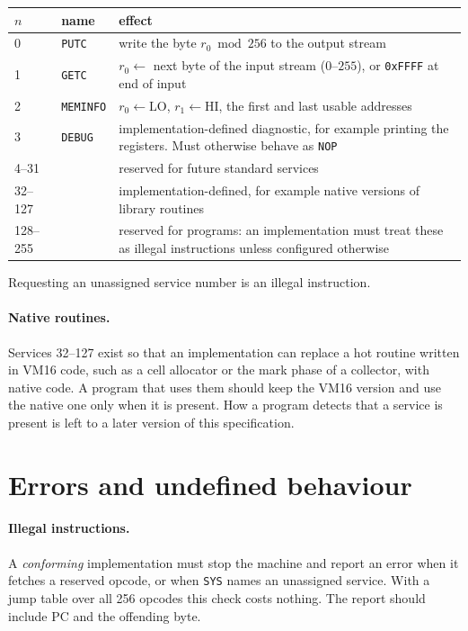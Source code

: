 \documentclass[11pt,a4paper]{article}
\newcommand{\vm}{VM16}
\newcommand{\op}[1]{\texttt{#1}}
\newcommand{\hx}[1]{\texttt{0x#1}}
\newcommand{\R}[1]{r_{#1}}
\begin{document}
\begin{center}
\small
\begin{tabularx}{\linewidth}{@{}l l X@{}}
\toprule
$n$ & name & effect\\
\midrule
0 & \op{PUTC} & write the byte $\R{0} \bmod 256$ to the output stream\\
1 & \op{GETC} & $\R{0} \gets$ next byte of the input stream ($0$--$255$), or \hx{FFFF} at end of input\\
2 & \op{MEMINFO} & $\R{0} \gets \mathrm{LO}$, $\R{1} \gets \mathrm{HI}$, the first and last usable addresses\\
3 & \op{DEBUG} & implementation-defined diagnostic, for example printing the registers. Must otherwise behave as \op{NOP}\\
4--31 & & reserved for future standard services\\
32--127 & & implementation-defined, for example native versions of library routines\\
128--255 & & reserved for programs: an implementation must treat these as illegal instructions unless configured otherwise\\
\bottomrule
\end{tabularx}
\end{center}

Requesting an unassigned service number is an illegal instruction.

\paragraph{Native routines.} Services 32--127 exist so that an implementation
can replace a hot routine written in \vm{} code, such as a cell allocator or
the mark phase of a collector, with native code. A program that uses them
should keep the \vm{} version and use the native one only when it is present.
How a program detects that a service is present is left to a later version of
this specification.

\section{Errors and undefined behaviour}\label{sec:ub}

\paragraph{Illegal instructions.} A \emph{conforming} implementation must
stop the machine and report an error when it fetches a reserved opcode, or
when \op{SYS} names an unassigned service. With a jump table over all 256
opcodes this check costs nothing. The report should include PC and the
offending byte.
\end{document}
